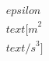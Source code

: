 \documentclass[preview]{standalone}
\begin{document}
\begin{align*}
\quad\\epsilon \quad\\text{ [m}^2\quad\\text{/s}^3]
\end{align*}
\end{document}
